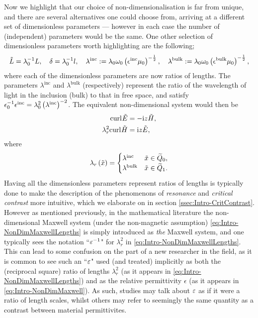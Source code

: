 Now we highlight that our choice of non-dimensionalisation is far from unique, and there are several alternatives one could choose from, arriving at a different set of dimensionless parameters --- however in each case the number of (independent) parameters would be the same.
One other selection of dimensionless parameters worth highlighting are the following;
\begin{align} \label{eq:Intro-NonDimLengthScales}
	\tilde{L} = \lambda_0^{-1}L, \quad
	\delta = \lambda_0^{-1}l, \quad
	\lambda^{\mathrm{inc}} := \lambda_0\omega_0\left( \epsilon^{\mathrm{inc}}\mu_0 \right)^{-\frac{1}{2}}, \quad
	\lambda^{\mathrm{bulk}} := \lambda_0\omega_0\left( \epsilon^{\mathrm{bulk}}\mu_0 \right)^{-\frac{1}{2}},
\end{align}
where each of the dimensionless parameters are now ratios of lengths.
The parameters $\lambda^{\mathrm{inc}}$ and $\lambda^{\mathrm{bulk}}$ (respectively) represent the ratio of the wavelength of light in the inclusion (bulk) to that in free space, and satisfy $\epsilon_0^{-1}\epsilon^{\mathrm{inc}} = \lambda_0^2\left( \lambda^{\mathrm{inc}} \right)^{-2}$.
The equivalent non-dimensional system would then be
\begin{subequations} \label{eq:Intro-NonDimMaxwellLengths}
	\begin{align}
		\mathrm{curl}_{}\tilde{E} &= -\mathrm{i} z\tilde{H}, \\
		\lambda_{r}^2\mathrm{curl}_{}\tilde{H} &= \mathrm{i} z\tilde{E},
	\end{align}
\end{subequations}
where
\begin{align*}
	\lambda_r\left( \tilde{x} \right) = 
	\begin{cases} 
		\lambda^{\mathrm{inc}} & \tilde{x}\in\widetilde{Q}_0, \\
		\lambda^{\mathrm{bulk}} & \tilde{x}\in\widetilde{Q}_1.
	\end{cases}
\end{align*}
Having all the dimensionless parameters represent ratios of lengths is typically done to make the description of the phenomenons of \emph{resonance} and \emph{critical contrast} more intuitive, which we elaborate on in section \ref{ssec:Intro-CritContrast}.
However as mentioned previously, in the mathematical literature the non-dimensional Maxwell system (under the non-magnetic assumption) \eqref{eq:Intro-NonDimMaxwellLengths} is simply introduced as \emph{the} Maxwell system, and one typically sees the notation ``$\varepsilon^{-1}$" for $\lambda_r^2$ in \eqref{eq:Intro-NonDimMaxwellLengths}.
This can lead to some confusion on the part of a new researcher in the field, as it is common to see such an ``$\varepsilon$" used (and treated) implicitly as both the (reciprocal square) ratio of lengths $\lambda_r^2$ (as it appears in \eqref{eq:Intro-NonDimMaxwellLengths}) and as the relative permittivity $\epsilon$ (as it appears in \eqref{eq:Intro-NonDimMaxwell}).
As such, studies may talk about $\varepsilon$ as if it were a ratio of length scales, whilst others may refer to seemingly the same quantity as a contrast between material permittivites.

